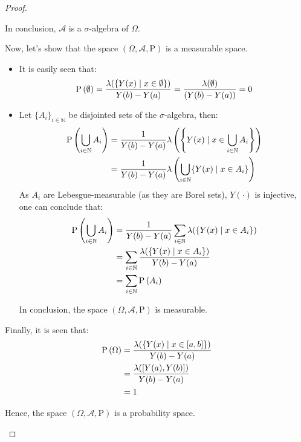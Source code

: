 \documentclass[11pt]{article}
\theoremstyle{definition}
\theoremstyle{remark}
\theoremstyle{remark}
\newcommand{\N}{\mathbb{N}}
\begin{document}
\begin{proof}
\begin{enumerate}[label=\alph*)]
\begin{itemize}
        In conclusion, $\mathcal{A}$ is a $\sigma$-algebra of
        $\Omega$.
      \end{itemize}

      Now, let's show that the space
      $(\Omega, \mathcal{A}, \mathrm{P})$ is a measurable space.
      \begin{itemize}
      \item It is easily seen that:
        \begin{equation*}
          \P{\emptyset} = \frac{\lambda(\{Y(x) \mid x \in \emptyset\})}{Y(b) - Y(a)}
          = \frac{\lambda(\emptyset)}{(Y(b) - Y(a))} = 0
        \end{equation*}

      \item Let $\{A_i\}_{i \in \N}$ be disjointed sets of the
        $\sigma$-algebra, then:
        \begin{align*}
          \P{\bigcup_{i \in \N} A_i}
          &= \frac{1}{Y(b) - Y(a)}\lambda\left(
            \left\{Y(x) \mid x \in \bigcup_{i \in \N} A_i\right\}\right) \\
          &= \frac{1}{Y(b) - Y(a)} \lambda\left(\bigcup_{i \in \N}\{Y(x) \mid x \in A_i\}\right)
        \end{align*}
        As $A_i$ are Lebesgue-measurable (as they are Borel sets),
        $Y(\cdot)$ is injective, one can conclude that:
        \begin{align*}
          \P{\bigcup_{i \in \N} A_i}
          &= \frac{1}{Y(b) - Y(a)}\sum_{i \in \N} \lambda(\{Y(x) \mid x \in A_i\}) \\
          &= \sum_{i \in \N} \frac{\lambda(\{Y(x) \mid x \in A_i\})}{Y(b) - Y(a)} \\
          &= \sum_{i \in \N} \P{A_i}
        \end{align*}

        In conclusion, the space $(\Omega, \mathcal{A}, \mathrm{P})$
        is measurable.
      \end{itemize}

      Finally, it is seen that:
      \begin{align*}
        \P{\Omega} &= \frac{\lambda(\{Y(x) \mid x \in [a, b]\})}{Y(b) - Y(a)} \\
                   &= \frac{\lambda([Y(a), Y(b)])}{Y(b) - Y(a)} \\
                   &= 1
      \end{align*}

      Hence, the space $(\Omega, \mathcal{A}, \mathrm{P})$ is a
      probability space.


\end{enumerate}
\end{proof}
\end{document}

